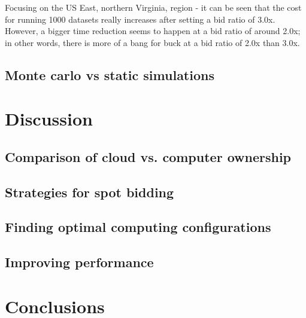 \documentclass{frontiersSCNS} %
\begin{document}
Focusing on the US East, northern Virginia, region - it can be seen that the cost for running 1000 datasets really increases after setting a bid ratio of 3.0x. However, a bigger time reduction seems to happen at a bid ratio of around 2.0x; in other words, there is more of a bang for buck at a bid ratio of 2.0x than 3.0x.



\subsection{Monte carlo vs static simulations}



\section{Discussion}

\subsection{Comparison of cloud vs. computer ownership}

\subsection{Strategies for spot bidding}

\subsection{Finding optimal computing configurations}

\subsection{Improving performance}

\section{Conclusions}
\end{document}
